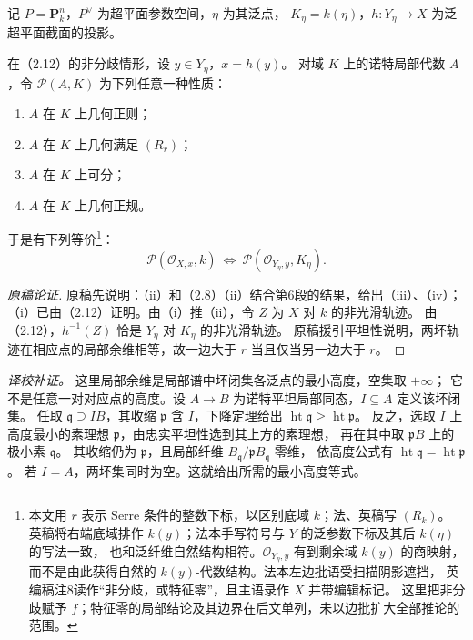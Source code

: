 \begingroup
\def\OO{\mathcal O}\def\FF{\mathcal F}\def\GG{\mathcal G}
\def\PP{\mathbf P}\def\calP{\mathcal P}\def\dd{\delta}
\def\Div{\operatorname{Div}}\def\depth{\operatorname{depth}}
\def\pr{\operatorname{pr}}\def\coker{\operatorname{coker}}
记 $P=\PP^n_k$，$P^\vee$ 为超平面参数空间，$\eta$ 为其泛点，
$K_\eta=k(\eta)$，$h:Y_\eta\to X$ 为泛超平面截面的投影。


在（2.12）的非分歧情形，设 $y\in Y_\eta$，$x=h(y)$。
对域 $K$ 上的诺特局部代数 $A$，令 $\mathcal P(A,K)$ 为下列任意一种性质：
\begin{enumerate}
 \item[(i)] $A$ 在 $K$ 上几何正则；
 \item[(ii)] $A$ 在 $K$ 上几何满足 $(R_r)$；
 \item[(iii)] $A$ 在 $K$ 上可分；
 \item[(iv)] $A$ 在 $K$ 上几何正规。
\end{enumerate}
于是有下列等价\footnote{本文用 $r$ 表示 Serre 条件的整数下标，以区别底域 $k$；法、英稿写 $(R_k)$。
英稿将右端底域排作 $k(y)$；法本手写符号与 $Y$ 的泛参数下标及其后 $k(\eta)$ 的写法一致，
也和泛纤维自然结构相符。$\OO_{Y_\eta,y}$ 有到剩余域 $k(y)$ 的商映射，
而不是由此获得自然的 $k(y)$-代数结构。法本左边批语受扫描阴影遮挡，
英编稿注8读作“非分歧，或特征零”，且主语录作 $X$ 并带编辑标记。
这里把非分歧赋予 $f$；特征零的局部结论及其边界在后文单列，未以边批扩大全部推论的范围。}：
\[
 \mathcal P(\OO_{X,x},k)\ \Longleftrightarrow\
 \mathcal P(\OO_{Y_\eta,y},K_\eta).
\]
\begin{proof}[原稿论证]
原稿先说明：（ii）和（2.8）（ii）结合第6段的结果，给出（iii）、（iv）；
（i）已由（2.12）证明。由（i）推（ii），令 $Z$ 为 $X$ 对 $k$ 的非光滑轨迹。
由（2.12），$h^{-1}(Z)$ 恰是 $Y_\eta$ 对 $K_\eta$ 的非光滑轨迹。
原稿援引平坦性说明，两坏轨迹在相应点的局部余维相等，故一边大于 $r$ 当且仅当另一边大于 $r$。
\end{proof}

\noindent\emph{译校补证。}
这里局部余维是局部谱中坏闭集各泛点的最小高度，空集取 $+\infty$；
它不是任意一对对应点的高度。设 $A\to B$ 为诺特平坦局部同态，$I\subseteq A$ 定义该坏闭集。
任取 $\mathfrak q\supseteq IB$，其收缩 $\mathfrak p$ 含 $I$，下降定理给出
$\operatorname{ht}\mathfrak q\ge\operatorname{ht}\mathfrak p$。
反之，选取 $I$ 上高度最小的素理想 $\mathfrak p$，由忠实平坦性选到其上方的素理想，
再在其中取 $\mathfrak pB$ 上的极小素 $\mathfrak q$。
其收缩仍为 $\mathfrak p$，且局部纤维 $B_{\mathfrak q}/\mathfrak p B_{\mathfrak q}$ 零维，
依高度公式有 $\operatorname{ht}\mathfrak q=\operatorname{ht}\mathfrak p$。
若 $I=A$，两坏集同时为空。这就给出所需的最小高度等式。

